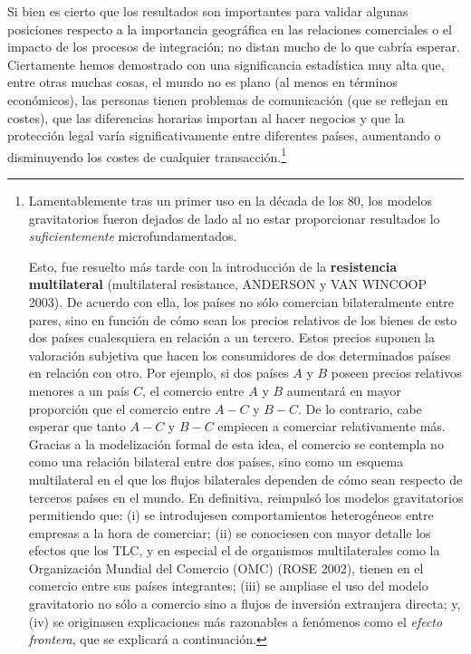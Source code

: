 \documentclass[10pt,a4paper]{article}
\begin{document}
Si bien es cierto que los resultados son importantes para validar algunas posiciones respecto a la importancia geográfica en las relaciones comerciales o el impacto de los procesos de integración; no distan mucho de lo que cabría esperar. Ciertamente hemos demostrado con una significancia estadística muy alta que, entre otras muchas cosas, el mundo no es plano (al menos en términos económicos), las personas tienen problemas de comunicación (que se reflejan en costes), que las diferencias horarias importan al hacer negocios y que la protección legal varía significativamente entre diferentes países, aumentando o disminuyendo los costes de cualquier transacción.\footnote{%
    Lamentablemente tras un primer uso en la década de los 80, los modelos gravitatorios fueron dejados de lado al no estar proporcionar resultados lo \textit{suficientemente} microfundamentados.

Esto, fue resuelto más tarde con la introducción de la \textbf{resistencia multilateral} (multilateral resistance, ANDERSON y VAN WINCOOP 2003). De acuerdo con ella, los países no sólo comercian bilateralmente entre pares, sino en función de cómo sean los precios relativos de los bienes de esto dos países cualesquiera en relación a un tercero. Estos precios suponen la valoración subjetiva que hacen los consumidores de dos determinados países en relación con otro. Por ejemplo, si dos países $A$ y $B$ poseen precios relativos menores a un país $C$, el comercio entre $A$ y $B$ aumentará en mayor proporción que el comercio entre $A-C$ y $B-C$. De lo contrario, cabe esperar que tanto $A-C$ y $B-C$ empiecen a comerciar relativamente más. Gracias a la modelización formal de esta idea, el comercio se contempla no como una relación bilateral entre dos países, sino como un esquema multilateral en el que los flujos bilaterales dependen de cómo sean respecto de terceros países en el mundo. En definitiva, reimpulsó los modelos gravitatorios permitiendo que: (i) se introdujesen comportamientos heterogéneos entre empresas a la hora de comerciar; (ii) se conociesen con mayor detalle los efectos que los TLC, y en especial el de organismos multilaterales como la Organización Mundial del Comercio (OMC) (ROSE 2002), tienen en el comercio entre sus países integrantes; (iii) se ampliase el uso del modelo gravitatorio no sólo a comercio sino a flujos de inversión extranjera directa; y, (iv) se originasen explicaciones más razonables a fenómenos como el \textit{efecto frontera}, que se explicará a continuación.
} 
\end{document}
